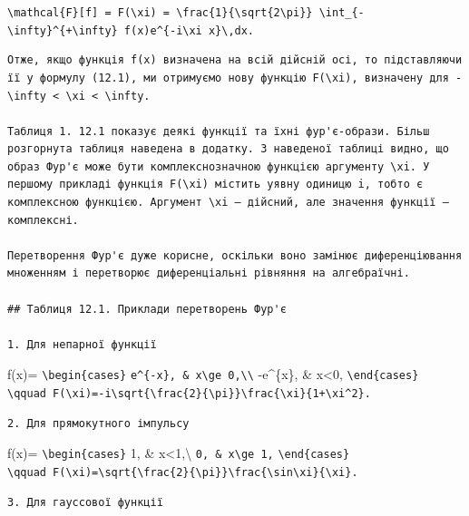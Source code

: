 \documentclass[
  ukrainian,
]{article}
\begin{document}
\texttt{\textbackslash{}mathcal\{F\}{[}f{]}\ =\ F(\textbackslash{}xi)\ =\ \textbackslash{}frac\{1\}\{\textbackslash{}sqrt\{2\textbackslash{}pi\}\}\ \textbackslash{}int\_\{-\textbackslash{}infty\}\^{}\{+\textbackslash{}infty\}\ f(x)e\^{}\{-i\textbackslash{}xi\ x\}\textbackslash{},dx.}

\begin{verbatim}
Отже, якщо функція f(x) визначена на всій дійсній осі, то підставляючи її у формулу (12.1), ми отримуємо нову функцію F(\xi), визначену для -\infty < \xi < \infty.

Таблиця 1. 12.1 показує деякі функції та їхні фур'є-образи. Більш розгорнута таблиця наведена в додатку. З наведеної таблиці видно, що образ Фур'є може бути комплекснозначною функцією аргументу \xi. У першому прикладі функція F(\xi) містить уявну одиницю i, тобто є комплексною функцією. Аргумент \xi — дійсний, але значення функції — комплексні.

Перетворення Фур'є дуже корисне, оскільки воно замінює диференціювання множенням і перетворює диференціальні рівняння на алгебраїчні.

## Таблиця 12.1. Приклади перетворень Фур'є

1. Для непарної функції
\end{verbatim}

f(x)= \texttt{\textbackslash{}begin\{cases\}}
\texttt{e\^{}\{-x\},\ \&\ x\textbackslash{}ge\ 0,\textbackslash{}\textbackslash{}}
-e\^{}\{x\}, \& x\textless0, \texttt{\textbackslash{}end\{cases\}}
\texttt{\textbackslash{}qquad\ F(\textbackslash{}xi)=-i\textbackslash{}sqrt\{\textbackslash{}frac\{2\}\{\textbackslash{}pi\}\}\textbackslash{}frac\{\textbackslash{}xi\}\{1+\textbackslash{}xi\^{}2\}.}

\begin{verbatim}
2. Для прямокутного імпульсу
\end{verbatim}

f(x)= \texttt{\textbackslash{}begin\{cases\}} 1, \&
\textbar x\textbar\textless1,\textbackslash{}
\texttt{0,\ \&\ \textbar{}x\textbar{}\textbackslash{}ge\ 1,}
\texttt{\textbackslash{}end\{cases\}}
\texttt{\textbackslash{}qquad\ F(\textbackslash{}xi)=\textbackslash{}sqrt\{\textbackslash{}frac\{2\}\{\textbackslash{}pi\}\}\textbackslash{}frac\{\textbackslash{}sin\textbackslash{}xi\}\{\textbackslash{}xi\}.}

\begin{verbatim}
3. Для гауссової функції
\end{verbatim}
\end{document}
